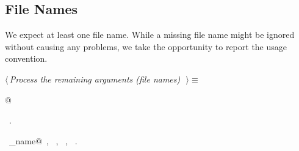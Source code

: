 \documentclass{report}
\begin{document}
\subsection{File Names}

We expect at least one file name. While a missing file name might be
ignored without causing any problems, we take the opportunity to report
the usage convention.
\begin{flushleft} \small
\begin{minipage}{\linewidth} \label{scrap27}
$\langle\,${\it Process the remaining arguments (file names)}\nobreak\ {\footnotesize {}}$\,\rangle\equiv$
\vspace{-1ex}
\begin{list}{}{} \item
\mbox{}@{\NWsep}
\end{list}
\vspace{-1ex}
\footnotesize\addtolength{\baselineskip}{-1ex}
\begin{list}{}{\setlength{\itemsep}{-\parsep}\setlength{\itemindent}{-\leftmargin}}
\item \NWtxtMacroRefIn\ .
\end{list}
\vspace{-2ex}
\footnotesize\addtolength{\baselineskip}{-1ex}
\begin{list}{}{\setlength{\itemsep}{-\parsep}\setlength{\itemindent}{-\leftmargin}}
\item \NWtxtIdentsUsed\nobreak\  \verb@command_name@\nobreak\ , \verb@exit@\nobreak\ , \verb@fprintf@\nobreak\ , \verb@stderr@\nobreak\ .\end{list}
\end{minipage}\\[4ex]
\end{flushleft}
\end{document}
